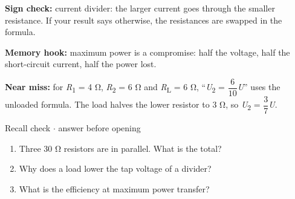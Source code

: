 \documentclass[11pt]{article}
\begin{document}
\begin{keepsection}
\begin{keepsection}
\begin{notebox}\textbf{Sign check:} current divider: the larger current goes through the smaller resistance. If your result says otherwise, the resistances are swapped in the formula.\end{notebox}

\begin{notebox}\textbf{Memory hook:} maximum power is a compromise: half the voltage, half the short-circuit current, half the power lost.\end{notebox}

\begin{notebox}\textbf{Near miss:} for \textit{R}\textsubscript{1} = 4 Ω, \textit{R}\textsubscript{2} = 6 Ω and \textit{R}\textsubscript{L} = 6 Ω, “\textit{U}\textsubscript{2} = {\small\ensuremath{\dfrac{6}{10}}}\textit{U}” uses the unloaded formula. The load halves the lower resistor to 3 Ω, so \textit{U}\textsubscript{2} = {\small\ensuremath{\dfrac{3}{7}}}\textit{U}.\end{notebox}

\begin{recallbox}{Recall check \ensuremath{\cdot} answer before opening}
\begin{enumerate}
\item Three 30 Ω resistors are in parallel. What is the total?
\item Why does a load lower the tap voltage of a divider?
\item What is the efficiency at maximum power transfer?
\end{enumerate}

\end{recallbox}
\end{keepsection}
\end{keepsection}
\end{document}
